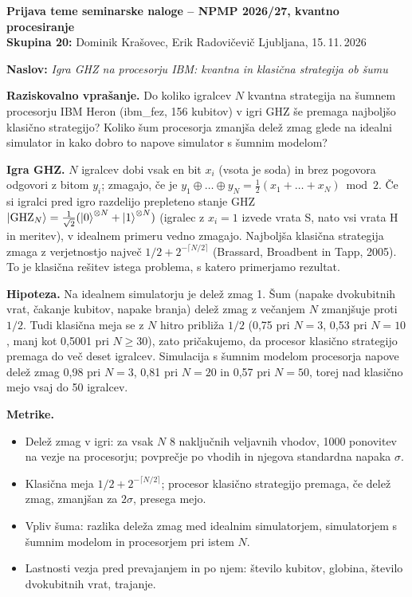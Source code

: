 \documentclass[10pt,a4paper]{article}
\begin{document}
{\large\textbf{Prijava teme seminarske naloge -- NPMP 2026/27, kvantno procesiranje}}\\
\textbf{Skupina 20:} Dominik Krašovec, Erik Radovičevič \hfill Ljubljana, 15.\,11.\,2026

\medskip
\textbf{Naslov:} \emph{Igra GHZ na procesorju IBM: kvantna in klasična strategija ob šumu}

\textbf{Raziskovalno vprašanje.} Do koliko igralcev $N$ kvantna strategija na šumnem procesorju IBM Heron (ibm\_fez, 156
kubitov) v igri GHZ še premaga najboljšo klasično strategijo? Koliko šum procesorja zmanjša delež zmag glede na idealni
simulator in kako dobro to napove simulator s šumnim modelom?

\textbf{Igra GHZ.} $N$ igralcev dobi vsak en bit $x_i$ (vsota je soda) in brez pogovora odgovori z bitom $y_i$; zmagajo, če je
$y_1\oplus\dots\oplus y_N=\tfrac12(x_1+\dots+x_N)\bmod 2$. Če si igralci pred igro razdelijo prepleteno stanje GHZ
$\ket{\mathrm{GHZ}_N}=\tfrac{1}{\sqrt2}(\ket{0}^{\otimes N}+\ket{1}^{\otimes N})$ (igralec z $x_i=1$ izvede vrata S, nato vsi
vrata H in meritev), v idealnem primeru vedno zmagajo. Najboljša klasična strategija zmaga z verjetnostjo največ
$1/2+2^{-\lceil N/2\rceil}$ (Brassard, Broadbent in Tapp, 2005). To je klasična rešitev istega problema, s katero primerjamo
rezultat.

\textbf{Hipoteza.} Na idealnem simulatorju je delež zmag 1. Šum (napake dvokubitnih vrat, čakanje kubitov, napake branja)
delež zmag z večanjem $N$ zmanjšuje proti $1/2$. Tudi klasična meja se z $N$ hitro približa $1/2$ (0,75 pri $N=3$, 0,53 pri
$N=10$, manj kot 0,5001 pri $N\ge 30$), zato pričakujemo, da procesor klasično strategijo premaga do več deset igralcev.
Simulacija s šumnim modelom procesorja napove delež zmag 0,98 pri $N=3$, 0,81 pri $N=20$ in 0,57 pri $N=50$, torej nad
klasično mejo vsaj do 50 igralcev.

\textbf{Metrike.}
\begin{itemize}
\item Delež zmag v igri: za vsak $N$ 8 naključnih veljavnih vhodov, 1000 ponovitev na vezje na procesorju; povprečje po
      vhodih in njegova standardna napaka $\sigma$.
\item Klasična meja $1/2+2^{-\lceil N/2\rceil}$; procesor klasično strategijo premaga, če delež zmag, zmanjšan za $2\sigma$,
      presega mejo.
\item Vpliv šuma: razlika deleža zmag med idealnim simulatorjem, simulatorjem s šumnim modelom in procesorjem pri istem $N$.
\item Lastnosti vezja pred prevajanjem in po njem: število kubitov, globina, število dvokubitnih vrat, trajanje.
\end{itemize}
\end{document}
